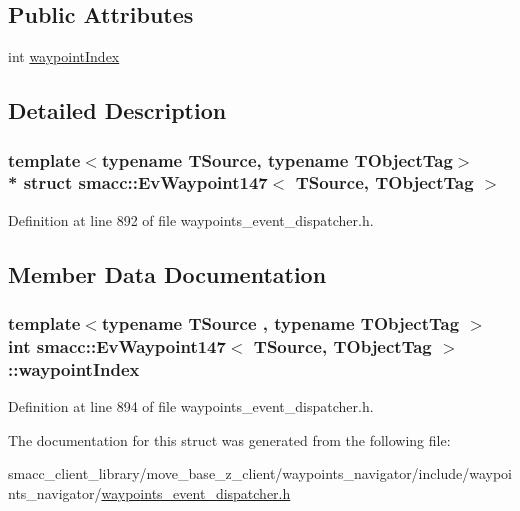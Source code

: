 \subsection*{Public Attributes}
\begin{DoxyCompactItemize}
\item 
int \hyperlink{structsmacc_1_1EvWaypoint147_ad0671c1e897176fd9cd78f092ba3441b}{waypoint\+Index}
\end{DoxyCompactItemize}


\subsection{Detailed Description}
\subsubsection*{template$<$typename T\+Source, typename T\+Object\+Tag$>$\\*
struct smacc\+::\+Ev\+Waypoint147$<$ T\+Source, T\+Object\+Tag $>$}



Definition at line 892 of file waypoints\+\_\+event\+\_\+dispatcher.\+h.



\subsection{Member Data Documentation}
\subsubsection[{\texorpdfstring{waypoint\+Index}{waypointIndex}}]{\setlength{\rightskip}{0pt plus 5cm}template$<$typename T\+Source , typename T\+Object\+Tag $>$ int {\bf smacc\+::\+Ev\+Waypoint147}$<$ T\+Source, T\+Object\+Tag $>$\+::waypoint\+Index}\hypertarget{structsmacc_1_1EvWaypoint147_ad0671c1e897176fd9cd78f092ba3441b}{}\label{structsmacc_1_1EvWaypoint147_ad0671c1e897176fd9cd78f092ba3441b}


Definition at line 894 of file waypoints\+\_\+event\+\_\+dispatcher.\+h.



The documentation for this struct was generated from the following file\+:\begin{DoxyCompactItemize}
\item 
smacc\+\_\+client\+\_\+library/move\+\_\+base\+\_\+z\+\_\+client/waypoints\+\_\+navigator/include/waypoints\+\_\+navigator/\hyperlink{waypoints__event__dispatcher_8h}{waypoints\+\_\+event\+\_\+dispatcher.\+h}\end{DoxyCompactItemize}
